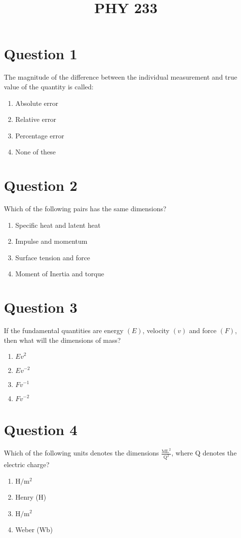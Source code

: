 \documentclass{article}
\title{PHY 233}
\begin{document}
                    \maketitle
                    \section*{Question 1}
The magnitude of the difference between the individual measurement and true value of the quantity is called:\newline
\begin{enumerate}[label=(\alph*)]
\item Absolute error
\item Relative error
\item Percentage error
\item None of these
\end{enumerate}
\newpage
\section*{Question 2}
Which of the following pairs has the same dimensions?
\begin{enumerate}[label=(\alph*)]
\item Specific heat and latent heat
\item Impulse and momentum
\item Surface tension and force
\item Moment of Inertia and torque
\end{enumerate}
\newpage
\section*{Question 3}
If the fundamental quantities are energy \((E)\), velocity \((v)\) and force \((F)\), then what will the dimensions of mass?
\begin{enumerate}[label=(\alph*)]
\item \({Ev}^{2}\)
\item \({Ev}^{-2}\)
\item \({Fv}^{-1}\)
\item \({Fv}^{-2}\)
\end{enumerate}
\newpage
\section*{Question 4}
Which of the following units denotes the dimensions \(\frac{\mathrm{ML}^2 }{\mathrm{Q}^2}\), where \(\mathrm{Q}\) denotes the electric charge?
\begin{enumerate}[label=(\alph*)]
\item \(\mathrm{H} / \mathrm{m}^2\)
\item Henry (H)
\item \(\mathrm{H} / \mathrm{m}^2\)
\item Weber (Wb)
\end{enumerate}
\newpage
\end{document}
